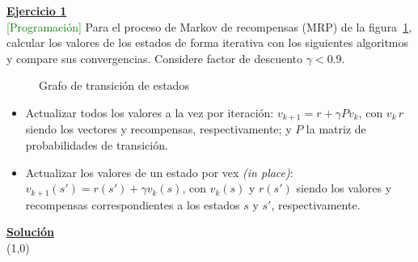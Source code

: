 \indent\underline{\textbf{Ejercicio 1}}\\
\textcolor{green}{[Programación]} Para el proceso de Markov de recompensas (MRP) de la figura~\ref{fig:grafo_1}, calcular los valores de los estados de forma iterativa con los
siguientes algoritmos y compare sus convergencias.
Considere factor de descuento $\gamma < 0.9$.\\

\begin{figure}[H]
    \centering
    \caption{Grafo de transición de estados}\label{fig:grafo_1}
\end{figure}


\begin{itemize}
    \item Actualizar todos los valores a la vez por iteración: $v_{k+1} = r + \gamma P v_k$, con $v_k\, r$ siendo los vectores y recompensas, respectivamente; y $P$ la matriz de probabilidades de transición.
    \item Actualizar los valores de un estado por vex \textit{(in place)}: $v_{k+1}(s') = r(s') + \gamma v_k(s)$, con $v_k(s)$ y $r(s')$ siendo los valores y recompensas correspondientes a los estados $s$ y $s'$, respectivamente.
\end{itemize}

\indent\underline{\textbf{Solución}}\\

\line(1,0){\textwidth}
